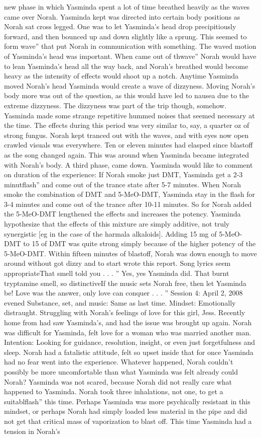 \documentclass[12pt]{book}
\begin{document}
new phase in which Yasminda spent a lot of time breathed heavily as the waves came over Norah. Yasminda kept was directed into certain body positions as Norah sat cross legged. One was to let Yasminda's head drop precipitiously forward, and then bounced up and down slightly like a sprung. This seemed to form wave'' that put Norah in communication with something. The waved motion of Yasminda's head was important. When came out of thwave'' Norah would have to lean Yasminda's head all the way back, and Norah's breathed would become heavy as the intensity of effects would shoot up a notch. Anytime Yasminda moved Norah's head Yasminda would create a wave of dizzyness. Moving Norah's body more was out of the question, as this would have led to nausea due to the extreme dizzyness. The dizzyness was part of the trip though, somehow. Yasminda made some strange repetitive hummed noises that seemed necessary at the time. The effects during this period was very similar to, say, a quarter oz of strong fungus. Norah kept tranced out with the waves, and with eyes now open crawled visuals was everywhere. Ten or eleven minutes had elasped since blastoff as the song changed again. This was around when Yasminda became integrated with Norah's body. A third phase, came down. Yasminda would like to comment on duration of the experience: If Norah smoke just DMT, Yasminda get a 2-3 minutflash'' and come out of the trance state after 5-7 minutes. When Norah smoke the combination of DMT and 5-MeO-DMT, Yasminda stay in the flash for 3-4 minutes and come out of the trance after 10-11 minutes. So for Norah added the 5-MeO-DMT lengthened the effects and increases the potency. Yasminda hypothesize that the effects of this mixture are simply additive, not truly synergistic [eg in the case of the harmala alkaloids]. Adding 15 mg of 5-MeO-DMT to 15 of DMT was quite strong simply because of the higher potency of the 5-MeO-DMT. Within fifteen minutes of blastoff, Norah was down enough to move around without got dizzy and to start wrote this report. Song lyrics seem appropriateThat smell told you . . . '' Yes, yes Yasminda did. That burnt tryptamine smell, so distinctiveIf the music sets Norah free, then let Yasminda be! Love was the answer, only love can conquer . . . '' Session 4: April 2, 2008 evened Substance, set, and music: Same as last time. Mindset: Emotionally distraught. Struggling with Norah's feelings of love for this girl, Jess. Recently home from had saw Yasminda's, and had the issue was brought up again. Norah was difficult for Yasminda, felt love for a woman who was married another man. Intention: Looking for guidance, resolution, insight, or even just forgetfulness and sleep. Norah had a fatalistic attitude, felt so upset inside that for once Yasminda had no fear went into the experience. Whatever happened, Norah couldn't possibly be more uncomfortable than what Yasminda was felt already could Norah? Yasminda was not scared, because Norah did not really care what happened to Yasminda. Norah took three inhalations, not one, to get a suitablflash'' this time. Perhaps Yasminda was more psychically resistant in this mindset, or perhaps Norah had simply loaded less material in the pipe and did not get that critical mass of vaporization to blast off. This time Yasminda had a tension in Norah's 
\end{document}
